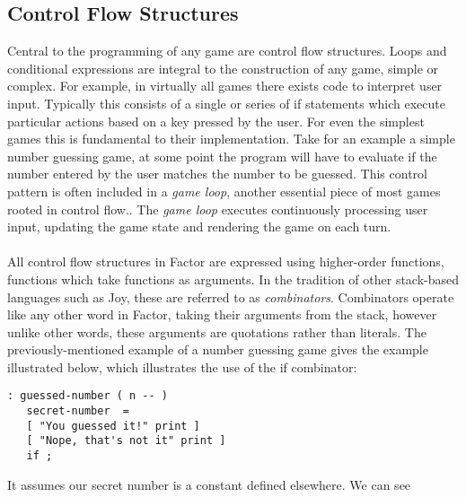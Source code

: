 \documentclass{sig-alternate}
\begin{document}
\subsection{Control Flow Structures}
Central to the programming of any game are control flow structures. 
 Loops and conditional expressions are integral to the construction of any game, 
 simple or complex. For example, in virtually all games there exists code to interpret 
 user input. Typically this consists of a single or  series of if statements which execute 
 particular actions based on a key pressed by the user. For even the simplest games this
 is fundamental to their implementation. Take for an example a simple number guessing game, at 
  some point the program will have to evaluate if the number entered by the user matches the 
  number to be guessed. This control pattern is often included in a \textit{game loop}, another essential 
  piece of most games rooted in control flow.. The \textit{game loop} executes continuously processing 
  user input, updating the game state and rendering the game on each turn.
\\\\
All control flow structures in Factor are expressed using higher-order functions, functions which take
 functions as arguments. In the tradition of other stack-based languages such as Joy, these are referred
  to as \textit{combinators}. Combinators operate like any other word in Factor, taking their arguments from the 
  stack, however unlike other words, these arguments are quotations rather than literals. The previously-mentioned example of a number guessing game gives the example illustrated below, which illustrates
    the use of the if combinator:    
    \begin{verbatim}
: guessed-number ( n -- ) 
   secret-number  = 
   [ "You guessed it!" print ] 
   [ "Nope, that's not it" print ] 
   if ; 
\end{verbatim} 
        It assumes our secret number is a constant defined elsewhere. We can see
\end{document}
